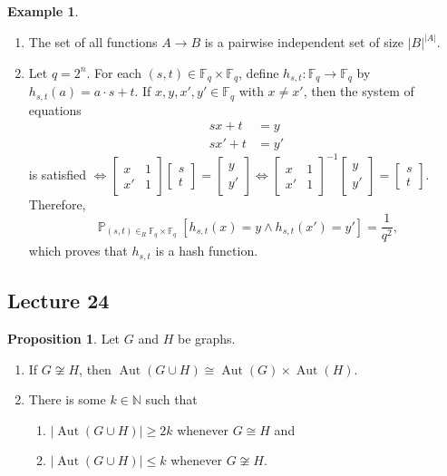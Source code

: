 \documentclass[10pt,letterpaper,cm]{nupset}
\theoremstyle{definition}
\newtheorem{exmp}[definition]{Example}
\theoremstyle{theorem}
\newtheorem{prop}[definition]{Proposition}
\theoremstyle{remark}
\newcommand{\F}{\mathbb F}
\newcommand{\N}{\mathbb N}
\newcommand{\1}{\mathbf{1}}
\newcommand{\0}{\vec 0}
\DeclareMathOperator{\aut}{Aut}
\DeclareMathOperator{\pr}{\mathbb{P}}
\begin{document}
\begin{exmp} $ $
\begin{enumerate}
\item The set of all functions $A \to B$ is a pairwise independent set of size $\left\lvert{B}\right\rvert^{\left\lvert{A}\right\rvert}$. 
\item
Let $q= 2^n$. For each $\left(s,t\right) \in \F_q \times \F_q$, define $h_{s,t} : \F_q \to \F_q$ by $h_{s,t}(a) = a \cdot s +t$. If $x,y, x', y' \in \F_q$ with $x \ne x'$, then the system of equations \begin{align*} 
sx + t & = y \\ sx' +t & = y'
\end{align*} 
is satisfied $\iff  \begin{bmatrix}  x & 1 \\ x' & 1   \end{bmatrix} \begin{bmatrix} s \\ t    \end{bmatrix} = \begin{bmatrix} y \\ y' \end{bmatrix} \iff  \begin{bmatrix}  x & 1 \\ x' & 1   \end{bmatrix}^{-1} \begin{bmatrix} y \\ y' \end{bmatrix}  = \begin{bmatrix} s \\ t    \end{bmatrix} $. Therefore, $$\pr_{(s,t)\in_R \F_q\times \F_q}\left[h_{s,t}(x) = y \land h_{s,t}(x') = y'\right] = \frac{1}{q^2},$$ which proves that $h_{s,t}$ is a hash function.
\end{enumerate}
\end{exmp}

\subsection{Lecture 24}

\begin{prop}
Let $G$ and $H$ be graphs. 
\begin{enumerate}
\item If $G \not\cong H$, then $\aut(G \cup H) \cong \aut(G) \times \aut(H)$. 
\item There is some $k\in \N$ such that  
\begin{enumerate}
\item $\left\lvert{\aut(G \cup H)}\right\rvert \geq 2k$ whenever $G \cong H$  and 
\item $\left\lvert{\aut(G \cup H)}\right\rvert \leq k$ whenever $G \not\cong H$. 
\end{enumerate}
\end{enumerate}
\end{prop}
\end{document}
